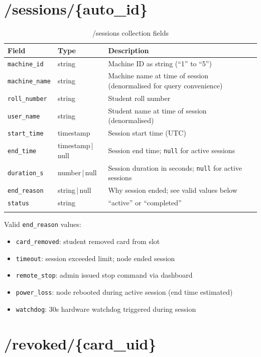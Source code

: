 \section{/sessions/\{auto\_id\}}

\begin{longtable}{L{3.5cm}L{2.5cm}L{8.5cm}}
\toprule
\textbf{Field} & \textbf{Type} & \textbf{Description} \\
\midrule
\endhead
\texttt{machine\_id} & string & Machine ID as string (``1'' to ``5'') \\
\texttt{machine\_name} & string & Machine name at time of session (denormalised for query convenience) \\
\texttt{roll\_number} & string & Student roll number \\
\texttt{user\_name} & string & Student name at time of session (denormalised) \\
\texttt{start\_time} & timestamp & Session start time (UTC) \\
\texttt{end\_time} & timestamp\,|\,null & Session end time; \texttt{null} for active sessions \\
\texttt{duration\_s} & number\,|\,null & Session duration in seconds; \texttt{null} for active sessions \\
\texttt{end\_reason} & string\,|\,null & Why session ended; see valid values below \\
\texttt{status} & string & ``active'' or ``completed'' \\
\bottomrule
\caption{/sessions collection fields}
\end{longtable}

Valid \texttt{end\_reason} values:
\begin{itemize}[leftmargin=1.5em,noitemsep]
    \item \texttt{card\_removed}: student removed card from slot
    \item \texttt{timeout}: session exceeded limit; node ended session
    \item \texttt{remote\_stop}: admin issued stop command via dashboard
    \item \texttt{power\_loss}: node rebooted during active session (end time estimated)
    \item \texttt{watchdog}: 30s hardware watchdog triggered during session
\end{itemize}

\section{/revoked/\{card\_uid\}}

